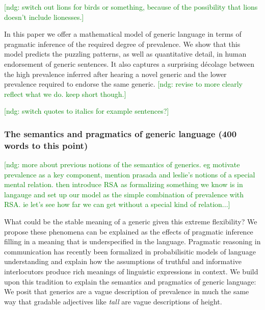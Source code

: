 \documentclass[10pt,letterpaper]{article}
\newcommand{\ndg}[1]{\textcolor{Green}{[ndg: #1]}}
\begin{document}
\ndg{switch out lions for birds or something, because of the possibility that lions doesn't include lionesses.}

In this paper we offer a mathematical model of generic language in terms of pragmatic inference of the required degree of prevalence. We show that this model predicts the puzzling patterns, as well as quantitative detail, in human endorsement of generic sentences. It also captures a surprising d\'{e}colage \cite{cimpian} between the high prevalence inferred after hearing a novel generic and the lower prevalence required to endorse the same generic.
 \ndg{revise to more clearly reflect what we do. keep short though.}

\ndg{switch quotes to italics for example sentences?}


\subsubsection{The semantics and pragmatics of generic language  (400 words to this point)}

\ndg{more about previous notions of the semantics of generics. eg motivate prevalence as a key component, mention prasada and leslie's notions of a special mental relation. then introduce RSA as formalizing something we know is in langauge and set up our model as the simple combination of prevalence with RSA. ie let's see how far we can get without a special kind of relation...}

What could be the stable meaning of a generic given this extreme flexibility? 
We propose these phenomena can be explained as the effects of pragmatic inference filling in a meaning that is underspecified in the language. 
Pragmatic reasoning in communication has recently been formalized in probabilisitic models of language understanding \cite{Frank2012, Goodman2013, Franke2009} and explain how the assumptions of truthful and informative interlocutors \cite{Clark1996, Grice1975, Levinson2000} produce rich meanings of linguistic expressions in context. 
We build upon this tradition to explain the semantics and pragmatics of generic language: We posit that generics are a vague description of prevalence in much the same way that gradable adjectives like \emph{tall} are vague descriptions of height. 
\end{document}
